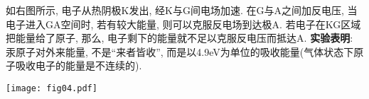 \begin{multicols}{2} 

如右图所示, 电子从热阴极K发出, 经K与G间电场加速. 在G与A之间加反电压, 当电子进入GA空间时, 若有较大能量, 则可以克服反电场到达极A. 若电子在KG区域把能量给了原子, 那么, 电子剩下的能量就不足以克服反电压而抵达A. \textbf{实验表明}: 汞原子对外来能量, 不是``来者皆收'', 而是以4.9eV为单位的吸收能量(气体状态下原子吸收电子的能量是不连续的).
\begin{center}
\texttt{[image: fig04.pdf]}
\end{center}
\end{multicols}

